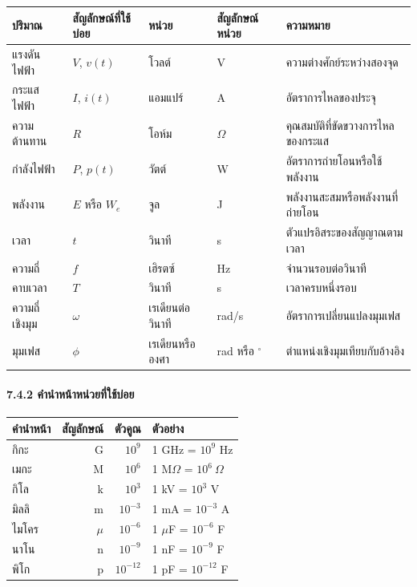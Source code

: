 \begin{table}[htbp]
    \centering
    \begin{tabular}{l l l l l}
        \hline
        \textbf{ปริมาณ} & \textbf{สัญลักษณ์ที่ใช้บ่อย} & \textbf{หน่วย} & \textbf{สัญลักษณ์หน่วย} & \textbf{ความหมาย} \\
        \hline
        แรงดันไฟฟ้า & $V$, $v(t)$ & โวลต์ & V & ความต่างศักย์ระหว่างสองจุด \\
        กระแสไฟฟ้า & $I$, $i(t)$ & แอมแปร์ & A & อัตราการไหลของประจุ \\
        ความต้านทาน & $R$ & โอห์ม & $\Omega$ & คุณสมบัติที่ขัดขวางการไหลของกระแส \\
        กำลังไฟฟ้า & $P$, $p(t)$ & วัตต์ & W & อัตราการถ่ายโอนหรือใช้พลังงาน \\
        พลังงาน & $E$ หรือ $W_e$ & จูล & J & พลังงานสะสมหรือพลังงานที่ถ่ายโอน \\
        เวลา & $t$ & วินาที & s & ตัวแปรอิสระของสัญญาณตามเวลา \\
        ความถี่ & $f$ & เฮิรตซ์ & Hz & จำนวนรอบต่อวินาที \\
        คาบเวลา & $T$ & วินาที & s & เวลาครบหนึ่งรอบ \\
        ความถี่เชิงมุม & $\omega$ & เรเดียนต่อวินาที & rad/s & อัตราการเปลี่ยนแปลงมุมเฟส \\
        มุมเฟส & $\phi$ & เรเดียนหรือองศา & rad หรือ $^\circ$ & ตำแหน่งเชิงมุมเทียบกับอ้างอิง \\
        \hline
    \end{tabular}
\end{table}

\paragraph{7.4.2 คำนำหน้าหน่วยที่ใช้บ่อย}

\begin{table}[htbp]
    \centering
    \begin{tabular}{l r r l}
        \hline
        \textbf{คำนำหน้า} & \textbf{สัญลักษณ์} & \textbf{ตัวคูณ} & \textbf{ตัวอย่าง} \\
        \hline
        กิกะ & G & $10^9$ & 1 GHz = $10^9$ Hz \\
        เมกะ & M & $10^6$ & 1 M$\Omega$ = $10^6\ \Omega$ \\
        กิโล & k & $10^3$ & 1 kV = $10^3$ V \\
        มิลลิ & m & $10^{-3}$ & 1 mA = $10^{-3}$ A \\
        ไมโคร & $\mu$ & $10^{-6}$ & 1 $\mu$F = $10^{-6}$ F \\
        นาโน & n & $10^{-9}$ & 1 nF = $10^{-9}$ F \\
        พิโก & p & $10^{-12}$ & 1 pF = $10^{-12}$ F \\
        \hline
    \end{tabular}
\end{table}

